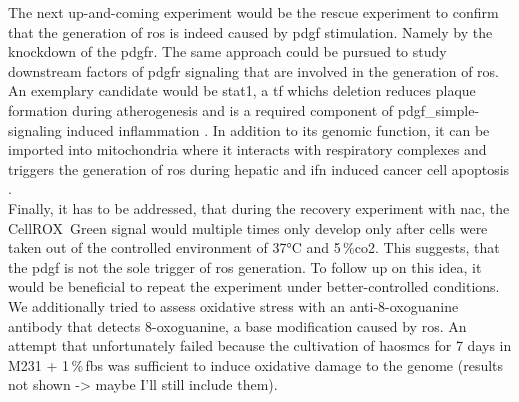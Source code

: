 The next up-and-coming experiment would be the rescue experiment to confirm that the generation of \ac{ros} is indeed caused by \ac{pdgf} stimulation. Namely by the knockdown of the \ac{pdgfr}\beta. The same approach could be pursued to study downstream factors of \ac{pdgfr} signaling that are involved in the generation of \ac{ros}. An exemplary candidate would be \ac{stat1}, a \ac{tf} whichs deletion reduces plaque formation during atherogenesis and is a required component of \ac{pdgf_simple}-signaling induced inflammation \cite{hePDGFRvSignallingRegulates2015}. In addition to its genomic function, it can be imported into mitochondria where it interacts with respiratory complexes and triggers the generation of \ac{ros} \cite{wangSTATROSCycleExtends2018} during hepatic \cite{leeRoleSTAT1IRF12007} and \ac{ifn} induced cancer cell apoptosis \cite{wangSTATROSCycleExtends2018}.\\
Finally, it has to be addressed, that during the recovery experiment with \ac{nac}, the CellROX\texttrademark~Green signal would multiple times only develop only after cells were taken out of the controlled environment of 37°C and 5\,\%\ac{co2}. This suggests, that the \ac{pdgf} is not the sole trigger of \ac{ros} generation. To follow up on this idea, it would be beneficial to repeat the experiment under better-controlled conditions. We additionally tried to assess oxidative stress with an anti-8-oxoguanine antibody that detects 8-oxoguanine, a base modification caused by \ac{ros}. An attempt that unfortunately failed because the cultivation of \acp{haosmc} for 7 days in M231 + 1\,\%\,\ac{fbs} was sufficient to induce oxidative damage to the genome (results not shown -> maybe I'll still include them).


